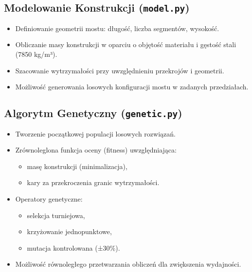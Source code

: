 \documentclass[12pt,a4paper]{article}
\begin{document}
\subsection{Modelowanie Konstrukcji (\texttt{model.py})}
\begin{itemize}
    \item Definiowanie geometrii mostu: długość, liczba segmentów, wysokość.
    \item Obliczanie masy konstrukcji w oparciu o objętość materiału i gęstość stali (7850 kg/m³).
    \item Szacowanie wytrzymałości przy uwzględnieniu przekrojów i geometrii.
    \item Możliwość generowania losowych konfiguracji mostu w zadanych przedziałach.
\end{itemize}

\subsection{Algorytm Genetyczny (\texttt{genetic.py})}
\begin{itemize}
    \item Tworzenie początkowej populacji losowych rozwiązań.
    \item Zrównoleglona funkcja oceny (fitness) uwzględniająca:
    \begin{itemize}
        \item masę konstrukcji (minimalizacja),
        \item kary za przekroczenia granic wytrzymałości.
    \end{itemize}
    \item Operatory genetyczne:
    \begin{itemize}
        \item selekcja turniejowa,
        \item krzyżowanie jednopunktowe,
        \item mutacja kontrolowana (±30\%).
    \end{itemize}
    \item Możliwość równoległego przetwarzania obliczeń dla zwiększenia wydajności.
\end{itemize}
\end{document}
